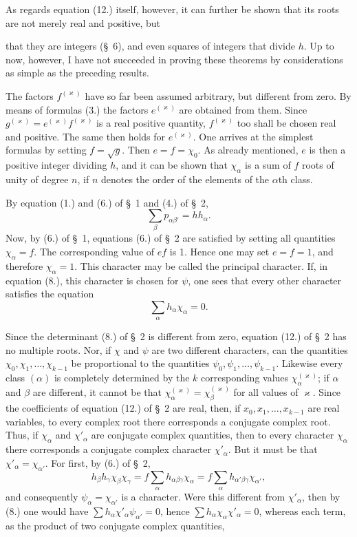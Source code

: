 \documentclass[11pt]{article}
\begin{document}
As regards equation (12.) itself, however, it can further be shown that its roots are not merely real and positive, but


that they are integers (\S~6), and even squares of integers that divide $h$. Up to now, however, I have not succeeded in proving these theorems by considerations as simple as the preceding results.

The factors $f^{(\varkappa)}$ have so far been assumed arbitrary, but different from zero. By means of formulas (3.) the factors $e^{(\varkappa)}$ are obtained from them. Since $g^{(\varkappa)}=e^{(\varkappa)}f^{(\varkappa)}$ is a real positive quantity, $f^{(\varkappa)}$ too shall be chosen real and positive. The same then holds for $e^{(\varkappa)}$. One arrives at the simplest formulas by setting $f=\sqrt{g}$. Then $e=f=\chi_0$. As already mentioned, $e$ is then a positive integer dividing $h$, and it can be shown that $\chi_\alpha$ is a sum of $f$ roots of unity of degree $n$, if $n$ denotes the order of the elements of the $\alpha$th class.

By equation (1.) and (6.) of \S~1 and (4.) of \S~2,
\begin{equation*}\tag{14.}
\sum_\beta p_{\alpha\beta'}=h h_\alpha.
\end{equation*}
Now, by (6.) of \S~1, equations (6.) of \S~2 are satisfied by setting all quantities $\chi_\alpha=f$. The corresponding value of $ef$ is 1. Hence one may set $e=f=1$, and therefore $\chi_\alpha=1$. This character may be called the principal character. If, in equation (8.), this character is chosen for $\psi$, one sees that every other character satisfies the equation
\begin{equation*}\tag{15.}
\sum_\alpha h_\alpha\chi_\alpha=0.
\end{equation*}

Since the determinant (8.) of \S~2 is different from zero, equation (12.) of \S~2 has no multiple roots. Nor, if $\chi$ and $\psi$ are two different characters, can the quantities $\chi_0,\chi_1,\ldots,\chi_{k-1}$ be proportional to the quantities $\psi_0,\psi_1,\ldots,\psi_{k-1}$. Likewise every class $(\alpha)$ is completely determined by the $k$ corresponding values $\chi_\alpha^{(\varkappa)}$; if $\alpha$ and $\beta$ are different, it cannot be that $\chi_\alpha^{(\varkappa)}=\chi_\beta^{(\varkappa)}$ for all values of $\varkappa$. Since the coefficients of equation (12.) of \S~2 are real, then, if $x_0,x_1,\ldots,x_{k-1}$ are real variables, to every complex root there corresponds a conjugate complex root. Thus, if $\chi_\alpha$ and $\chi'_\alpha$ are conjugate complex quantities, then to every character $\chi_\alpha$ there corresponds a conjugate complex character $\chi'_\alpha$. But it must be that $\chi'_\alpha=\chi_{\alpha'}$. For first, by (6.) of \S~2,
\[
h_\beta h_\gamma\chi_\beta\chi_\gamma=f\sum_\alpha h_{\alpha\beta\gamma}\chi_\alpha=f\sum_\alpha h_{\alpha'\beta\gamma}\chi_{\alpha'},
\]
and consequently $\psi_\alpha=\chi_{\alpha'}$ is a character. Were this different from $\chi'_\alpha$, then by (8.) one would have $\sum h_\alpha\chi'_{\alpha}\psi_{\alpha'}=0$, hence $\sum h_\alpha\chi_\alpha\chi'_{\alpha}=0$, whereas each term, as the product of two conjugate complex quantities,
\end{document}
